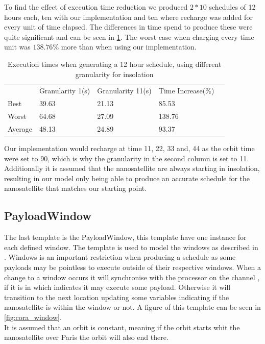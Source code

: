 To find the effect of execution time reduction we produced $2 * 10$ schedules of 12 hours each, ten with our implementation and ten where recharge was added for every unit of time elapsed.
The differences in time spend to produce these were quite significant and can be seen in \cref{tab:runTimes}.
The worst case when charging every time unit was $138.76\%$ more than when using our implementation.
\begin{table}[H]
	\centering
	\begin{tabular}{lllll}
		& Granularity 1(s)           & Granularity 11(s)          & Time Increase(\%)           &  \\ \cline{2-4}
		\multicolumn{1}{l|}{Best}    & \multicolumn{1}{l|}{39.63} & \multicolumn{1}{l|}{21.13} & \multicolumn{1}{l|}{85.53}  &  \\
		\multicolumn{1}{l|}{Worst}   & \multicolumn{1}{l|}{64.68} & \multicolumn{1}{l|}{27.09} & \multicolumn{1}{l|}{138.76} &  \\
		\multicolumn{1}{l|}{Average} & \multicolumn{1}{l|}{48.13} & \multicolumn{1}{l|}{24.89} & \multicolumn{1}{l|}{93.37}  &  \\ \cline{2-4}
	\end{tabular}
		\caption{Execution times when generating a 12 hour schedule, using different granularity for insolation}
		\label{tab:runTimes}
\end{table}
Our implementation would recharge at time 11, 22, 33 and, 44 as the orbit time were set to 90, which is why the granularity in the second column is set to 11.
Additionally it is assumed that the nanosatellite are always starting in insolation, resulting in our model only being able to produce an accurate schedule for the nanosatellite that matches our starting point.


\subsection{PayloadWindow}\label{ssec:cora_tw}
The last template is the PayloadWindow, this template have one instance for each defined window.
The template is used to model the windows as described in .
Windows is an important restriction when producing a schedule as some payloads may be pointless to execute outside of their respective windows.
When a change to a window occurs it will synchronise with the processor on the channel , if it is in  which indicates it may execute some payload.
Otherwise it will transition to the next location updating some variables indicating if the nanosatellite is within the window or not.
A figure of this template can be seen in \cref{fig:cora_window}.\\
It is assumed that an orbit is constant, meaning if the orbit starts whit the nanosatellite over Paris the orbit will also end there.  
